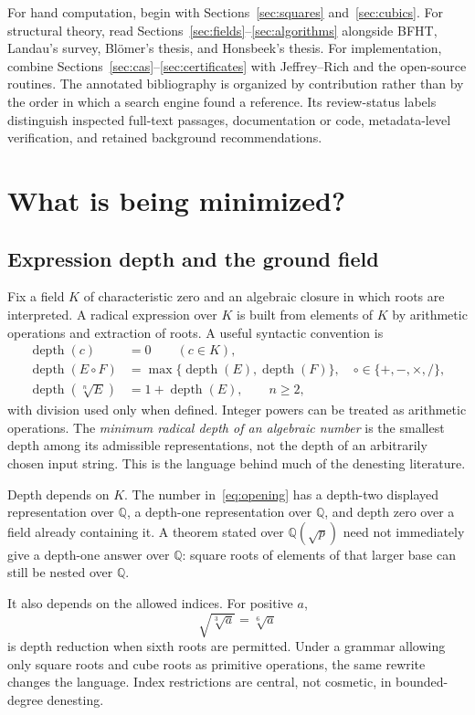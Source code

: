 \documentclass[11pt,a4paper]{article}
\newcommand{\Q}{\mathbb{Q}}
\newcommand{\depth}{\operatorname{depth}}
\theoremstyle{definition}
\theoremstyle{remark}
\numberwithin{equation}{section}
\begin{document}
For hand computation, begin with Sections~\ref{sec:squares} and~\ref{sec:cubics}. For structural theory, read Sections~\ref{sec:fields}--\ref{sec:algorithms} alongside BFHT, Landau's survey, Bl\"omer's thesis, and Honsbeek's thesis. For implementation, combine Sections~\ref{sec:cas}--\ref{sec:certificates} with Jeffrey--Rich and the open-source routines. The annotated bibliography is organized by contribution rather than by the order in which a search engine found a reference. Its review-status labels distinguish inspected full-text passages, documentation or code, metadata-level verification, and retained background recommendations.

\section{What is being minimized?}
\label{sec:definitions}

\subsection{Expression depth and the ground field}

Fix a field $K$ of characteristic zero and an algebraic closure in which roots are interpreted. A radical expression over $K$ is built from elements of $K$ by arithmetic operations and extraction of roots. A useful syntactic convention is
\begin{align}
 \depth(c)&=0\qquad(c\in K),\\
 \depth(E\mathbin{\circ}F)&=\max\{\depth(E),\depth(F)\},
   \quad \circ\in\{+,-,\times,/\},\\
 \depth(\sqrt[n]{E})&=1+\depth(E),\qquad n\ge2,
\end{align}
with division used only when defined. Integer powers can be treated as arithmetic operations. The \emph{minimum radical depth of an algebraic number} is the smallest depth among its admissible representations, not the depth of an arbitrarily chosen input string. This is the language behind much of the denesting literature.\cite{bfht,landau,honsbeek2005}

Depth depends on $K$. The number in~\eqref{eq:opening} has a depth-two displayed representation over $\Q$, a depth-one representation over $\Q$, and depth zero over a field already containing it. A theorem stated over $\Q(\sqrt p)$ need not immediately give a depth-one answer over $\Q$: square roots of elements of that larger base can still be nested over $\Q$.

It also depends on the allowed indices. For positive $a$,
\[
 \sqrt{\sqrt[3]{a}}=\sqrt[6]{a}
\]
is depth reduction when sixth roots are permitted. Under a grammar allowing only square roots and cube roots as primitive operations, the same rewrite changes the language. Index restrictions are central, not cosmetic, in bounded-degree denesting.\cite{blomer2000}
\end{document}
